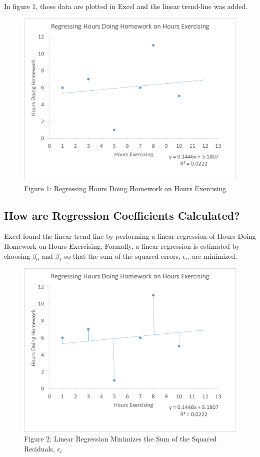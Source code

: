 \documentclass[]{book}
\theoremstyle{definition}
\theoremstyle{definition}
\theoremstyle{remark}
\begin{document}
In figure 1, these data are plotted in Excel and the linear trend-line
was added.

\begin{figure}[htbp]
\centering
\includegraphics{Excel-files/BasicStatisticsand-MT_Cars_Regression_files/image005.png}
\caption{Figure 1: Regressing Hours Doing Homework on Hours Exercising}
\end{figure}

\subsection{How are Regression Coefficients
Calculated?}\label{how-are-regression-coefficients-calculated}

Excel found the linear trend-line by performing a linear regression of
Hours Doing Homework on Hours Exercising. Formally, a linear regression
is estimated by choosing \(\beta_0\) and \(\beta_1\) so that the sum of
the squared errors, \(\epsilon_i\), are minimized.

\begin{figure}[htbp]
\centering
\includegraphics{Excel-files/BasicStatisticsand-MT_Cars_Regression_files/image026.png}
\caption{Figure 2: Linear Regression Minimizes the Sum of the Squared
Residuals, \(\epsilon_i\)}
\end{figure}
\end{document}
